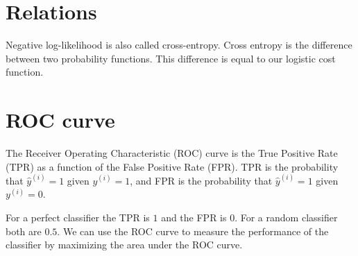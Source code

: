 \documentclass[a4paper]{article}
\begin{document}

\section{Relations}
Negative log-likelihood is also called cross-entropy. Cross entropy is the difference between two probability functions. This difference is equal to our logistic cost function.

\section{ROC curve}
The Receiver Operating Characteristic (ROC) curve is the True Positive Rate (TPR) as a function of the False Positive Rate (FPR). TPR is the probability that $\hat{y}^{(i)}=1$ given $y^{(i)}=1$, and FPR is the probability that $\hat{y}^{(i)}=1$ given $y^{(i)}=0$.

For a perfect classifier the TPR is $1$ and the FPR is $0$. For a random classifier both are $0.5$. We can use the ROC curve to measure the performance of the classifier by maximizing the area under the ROC curve.
\end{document}
